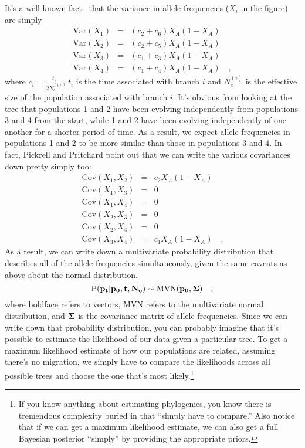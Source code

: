 \documentclass[12pt]{article}
\begin{document}
It's a well known fact~\cite{CavalliSforza-Edwards-1967} that the
variance in allele frequencies ($X_i$ in the figure) are simply
\begin{eqnarray*}
  \mbox{Var}(X_1) &=& (c_2 + c_6)X_A(1-X_A) \\
  \mbox{Var}(X_2) &=& (c_2 + c_5)X_A(1-X_A) \\
  \mbox{Var}(X_3) &=& (c_1 + c_3)X_A(1-X_A) \\
  \mbox{Var}(X_4) &=& (c_1 + c_4)X_A(1-X_A) \quad ,
\end{eqnarray*}
where $c_i = \frac{t_i}{2N_e^{(i)}}$, $t_i$ is the time associated
with branch $i$ and $N_e^{(i)}$ is the effective size of the
population associated with branch $i$. It's obvious from looking at
the tree that populations 1 and 2 have been evolving independently
from populations 3 and 4 from the start, while 1 and 2 have been
evolving independently of one another for a shorter period of time. As
a result, we expect allele frequencies in populations 1 and 2 to be
more similar than those in populations 3 and 4. In fact, Pickrell and
Pritchard point out that we can write the various covariances down
pretty simply too:
\begin{eqnarray*}
  \mbox{Cov}(X_1,X_2) &=& c_2X_A(1-X_A) \\
  \mbox{Cov}(X_1,X_3) &=& 0 \\
  \mbox{Cov}(X_1,X_4) &=& 0 \\
  \mbox{Cov}(X_2,X_3) &=& 0 \\
  \mbox{Cov}(X_2,X_4) &=& 0 \\
  \mbox{Cov}(X_3,X_4) &=& c_1X_A(1-X_A) \quad .
\end{eqnarray*}
As a result, we can write down a multivariate probability distribution
that describes all of the allele frequencies simultaneously, given the
same caveats as above about the normal distribution.
\[
  \mbox{P}(\bf p_t|\bf p_0, \bf t, \bf N_e) \sim \mbox{MVN}(\bf p_0,
  \bf \Sigma) \quad ,
\]
where boldface refers to vectors, MVN refers to the multivariate
normal distribution, and $\bf \Sigma$ is the covariance matrix of
allele frequencies. Since we can write down that probability
distribution, you can probably imagine that it's possible to estimate
the likelihood of our data given a particular tree. To get a maximum
likelihood estimate of how our populations are related, assuming
there's no migration, we simply have to compare the likelihoods across
all possible trees and choose the one that's most likely.\footnote{If
  you know anything about estimating phylogenies, you know there is
  tremendous complexity buried in that ``simply have to compare.''
  Also notice that if we can get a maximum likelihood estimate, we can
  also get a full Bayesian posterior ``simply'' by providing the
  appropriate priors.}
\end{document}
